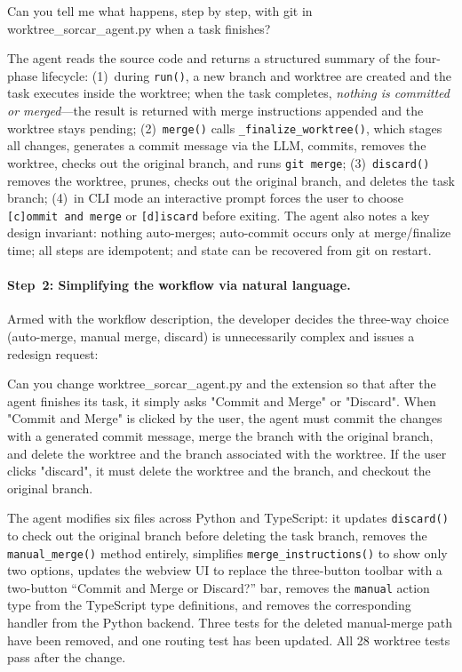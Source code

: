 \documentclass{article}
\begin{document}
\begin{prompt}
Can you tell me what happens, step by step, with git in worktree_sorcar_agent.py when a task finishes?
\end{prompt}

\noindent The agent reads the source code and returns a structured summary of the four-phase lifecycle: (1)~during \texttt{run()}, a new branch and worktree are created and the task executes inside the worktree; when the task completes, \emph{nothing is committed or merged}---the result is returned with merge instructions appended and the worktree stays pending; (2)~\texttt{merge()} calls \texttt{\_finalize\_worktree()}, which stages all changes, generates a commit message via the LLM, commits, removes the worktree, checks out the original branch, and runs \texttt{git merge}; (3)~\texttt{discard()} removes the worktree, prunes, checks out the original branch, and deletes the task branch; (4)~in CLI mode an interactive prompt forces the user to choose \texttt{[c]ommit and merge} or \texttt{[d]iscard} before exiting. The agent also notes a key design invariant: nothing auto-merges; auto-commit occurs only at merge/finalize time; all steps are idempotent; and state can be recovered from git on restart.

\paragraph{Step~2: Simplifying the workflow via natural language.} Armed with the workflow description, the developer decides the three-way choice (auto-merge, manual merge, discard) is unnecessarily complex and issues a redesign request:

\begin{prompt}
Can you change worktree_sorcar_agent.py and the extension so that after the agent 
finishes its task, it simply asks "Commit and Merge" or "Discard". When "Commit 
and Merge" is clicked by the user, the agent must commit the changes with a 
generated commit message, merge the branch with the original branch, and delete 
the worktree and the branch associated with the worktree. If the user clicks 
"discard", it must delete the worktree and the branch, and checkout the 
original branch.
\end{prompt}

\noindent The agent modifies six files across Python and TypeScript: it updates \texttt{discard()} to check out the original branch before deleting the task branch, removes the \texttt{manual\_merge()} method entirely, simplifies \texttt{merge\_instructions()} to show only two options, updates the webview UI to replace the three-button toolbar with a two-button ``Commit and Merge or Discard?'' bar, removes the \texttt{manual} action type from the TypeScript type definitions, and removes the corresponding handler from the Python backend.  Three tests for the deleted manual-merge path have been removed, and one routing test has been updated. All 28 worktree tests pass after the change.
\end{document}
